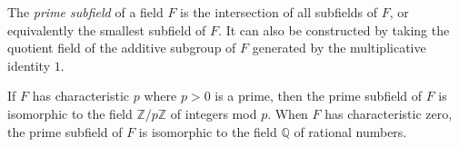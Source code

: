 \documentclass[12pt]{article}
\begin{document}
The {\em prime subfield} of a field $F$ is the intersection of all subfields of $F$, or equivalently the smallest subfield of $F$. It can also be constructed by taking the quotient field of the additive subgroup of $F$ generated by the multiplicative identity $1$.

If $F$ has characteristic $p$ where $p > 0$ is a prime, then the prime subfield of $F$ is isomorphic to the field $\mathbb{Z}/p\mathbb{Z}$ of integers mod $p$. When $F$ has characteristic zero, the prime subfield of $F$ is isomorphic to the field $\mathbb{Q}$ of rational numbers.
\end{document}
